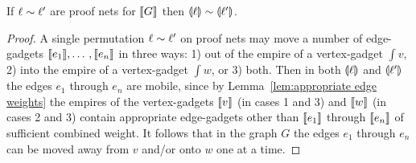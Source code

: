 \begin{lemma}
If $\ell\sim\ell'$ are proof nets for $\llbracket G\rrbracket$ then $\llparenthesis\ell\rrparenthesis\sim\llparenthesis\ell'\rrparenthesis$.
\end{lemma}

\begin{proof}
A single permutation $\ell\sim\ell'$ on proof nets may move a number of edge-gadgets $\llbracket e_1\rrbracket,\dotso,\llbracket e_n\rrbracket$ in three ways: 1) out of the empire of a vertex-gadget $\int v$, 2) into the empire of a vertex-gadget $\int w$, or 3) both.
%
Then in both $\llparenthesis\ell\rrparenthesis$ and $\llparenthesis\ell'\rrparenthesis$ the edges $e_1$ through $e_n$ are mobile, since by Lemma~\ref{lem:appropriate edge weights} the empires of the vertex-gadgets $\llbracket v\rrbracket$ (in cases 1 and 3) and $\llbracket w\rrbracket$ (in cases 2 and 3) contain appropriate edge-gadgets other than $\llbracket e_1\rrbracket$ through $\llbracket e_n\rrbracket$ of sufficient combined weight.
%
It follows that in the graph $G$ the edges $e_1$ through $e_n$ can be moved away from $v$ and/or onto $w$ one at a time.

\end{proof}











